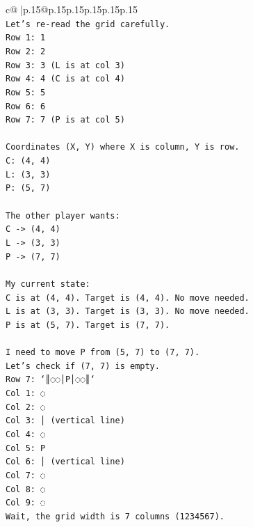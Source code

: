 \documentclass{article}
\begin{document}
{\begin{supertabular}{c@{$\;$}|p{.15\linewidth}@{}p{.15\linewidth}p{.15\linewidth}p{.15\linewidth}p{.15\linewidth}p{.15\linewidth}}
{{{\\ 
\texttt{Let's re{-}read the grid carefully.} \\
\texttt{Row 1: 1} \\
\texttt{Row 2: 2} \\
\texttt{Row 3: 3 (L is at col 3)} \\
\texttt{Row 4: 4 (C is at col 4)} \\
\texttt{Row 5: 5} \\
\texttt{Row 6: 6} \\
\texttt{Row 7: 7 (P is at col 5)} \\
\\ 
\texttt{Coordinates (X, Y) where X is column, Y is row.} \\
\texttt{C: (4, 4)} \\
\texttt{L: (3, 3)} \\
\texttt{P: (5, 7)} \\
\\ 
\texttt{The other player wants:} \\
\texttt{C {-}> (4, 4)} \\
\texttt{L {-}> (3, 3)} \\
\texttt{P {-}> (7, 7)} \\
\\ 
\texttt{My current state:} \\
\texttt{C is at (4, 4). Target is (4, 4). No move needed.} \\
\texttt{L is at (3, 3). Target is (3, 3). No move needed.} \\
\texttt{P is at (5, 7). Target is (7, 7).} \\
\\ 
\texttt{I need to move P from (5, 7) to (7, 7).} \\
\texttt{Let's check if (7, 7) is empty.} \\
\texttt{Row 7: `║◌◌│P│◌◌║`} \\
\texttt{Col 1: ◌} \\
\texttt{Col 2: ◌} \\
\texttt{Col 3: │ (vertical line)} \\
\texttt{Col 4: ◌} \\
\texttt{Col 5: P} \\
\texttt{Col 6: │ (vertical line)} \\
\texttt{Col 7: ◌} \\
\texttt{Col 8: ◌} \\
\texttt{Col 9: ◌} \\
\texttt{Wait, the grid width is 7 columns (1234567).} \\
}}}
\end{supertabular}}
\end{document}
